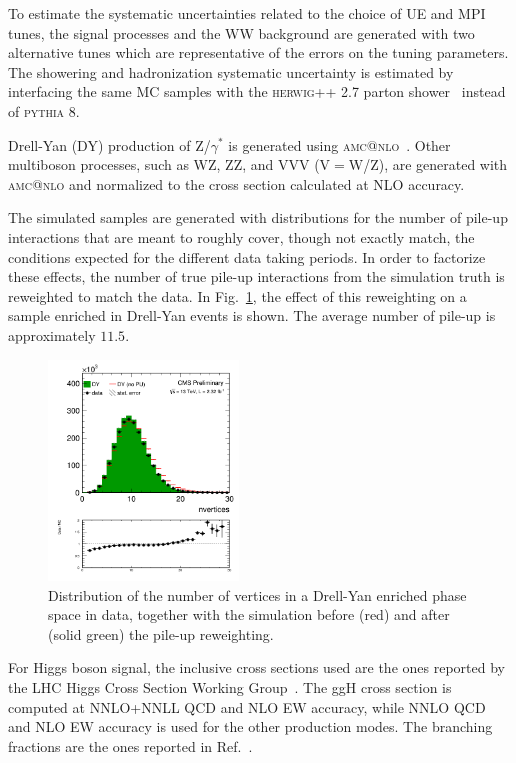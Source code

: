 To estimate the systematic uncertainties related to the choice of UE and MPI tunes, the signal processes and the WW background are generated with two alternative tunes which are representative of the errors on the tuning parameters.
The showering and hadronization systematic uncertainty is estimated by interfacing the same MC samples with the \textsc{herwig++} 2.7 parton shower~\cite{Richardson:2013nfo,Bellm:2013hwb} instead of \textsc{pythia 8}.

Drell-Yan (DY) production of Z/$\gamma^{*}$ is generated using \textsc{amc@nlo}~\cite{Alwall:2014hca}. 
Other multiboson processes, such as WZ, ZZ, and VVV (V$=$W/Z), are generated with \textsc{amc@nlo} and normalized to the cross section calculated at NLO accuracy.

The simulated samples are generated with distributions for the number of pile-up interactions that are meant to roughly cover, though not exactly match, the conditions expected for the different data taking periods. In order to factorize these effects, the number of true pile-up interactions from the simulation truth is reweighted to match the data.
In Fig.~\ref{Fig:pu}, the effect of this reweighting on a sample enriched in Drell-Yan events is shown. The average number of pile-up is approximately $11.5$.

\begin{figure}[htbp]
\centering
\includegraphics[width=0.45\textwidth]{images/13TeV/nvertices.png}
\caption{
    Distribution of the number of vertices in a Drell-Yan enriched phase space in data,
    together with the simulation before (red) and after (solid green) the pile-up reweighting.}
    \label{Fig:pu}
\end{figure}

For Higgs boson signal, the inclusive cross sections used are the ones reported by the LHC Higgs Cross Section Working Group~\cite{temphiggsxsecs}. The ggH cross section is computed at NNLO+NNLL QCD and NLO EW accuracy, while NNLO QCD and NLO EW accuracy is used for the other production modes. The branching fractions are the ones reported in Ref.~\cite{Heinemeyer:2013tqa}.

